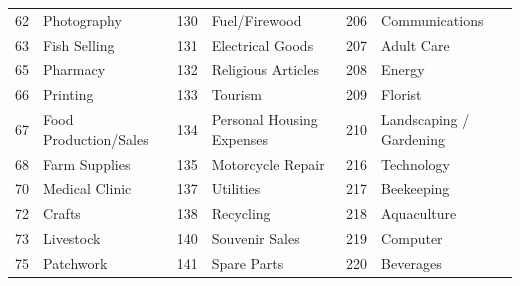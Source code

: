 \begin{longtable}[]{|r|l|r|l|r|l|}
	62                                & Photography                        & 130                               & Fuel/Firewood                      & 206                               & Communications                     \\
	63                                & Fish Selling                       & 131                               & Electrical Goods                   & 207                               & Adult Care                         \\
	65                                & Pharmacy                           & 132                               & Religious Articles                 & 208                               & Energy                             \\
	66                                & Printing                           & 133                               & Tourism                            & 209                               & Florist                            \\
	67                                & Food Production/Sales              & 134                               & Personal Housing Expenses          & 210                               &
	Landscaping / Gardening                                                                                                                                                                                                  \\
	68                                & Farm Supplies                      & 135                               & Motorcycle Repair                  & 216                               & Technology                         \\
	70                                & Medical Clinic                     & 137                               & Utilities                          & 217                               & Beekeeping                         \\
	72                                & Crafts                             & 138                               & Recycling                          & 218                               & Aquaculture                        \\
	73                                & Livestock                          & 140                               & Souvenir Sales                     & 219                               & Computer                           \\
	75                                & Patchwork                          & 141                               & Spare Parts                        & 220                               & Beverages                          \\

\end{longtable}
